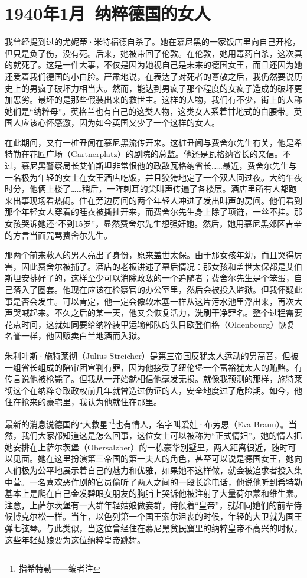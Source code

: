 \documentclass[UTF8]{ctexart}
\begin{document}
\section{1940年1月\ 纳粹德国的女人}

我曾经提到过的尤妮蒂·米特福德自杀了。她在慕尼黑的一家饭店里向自己开枪，但只是负了伤，没有死。后来，她被带回了伦敦。在伦敦，她用毒药自杀，这次真的就死了。这是一件大事，不仅是因为她视自己是未来的德国女王，而且还因为她还爱着我们德国的小白脸。严肃地说，在表达了对死者的尊敬之后，我仍然要说历史上的男疯子破坏力相当大。然而，能达到男疯子那个程度的女疯子造成的破坏更加恶劣。最坏的是那些假装出来的救世主。这样的人物，我们有不少，街上的人称她们是“纳粹母”。英格兰也有自己的这类人物，这类女人系着甘地式的白腰带。英国人应该心怀感激，因为如今英国又少了一个这样的女人。

在此期间，又有一桩丑闻在慕尼黑流传开来。这桩丑闻与费舍尔先生有关，他是希特勒在花匠广场（Gartnerplatz）的剧院的总监。他还是瓦格纳省长的亲信。不过，慕尼黑警察局长艾伯斯坦非常恨他的政敌瓦格纳省长……最近，费舍尔先生与一名极为年轻的女士在女王酒店吃饭，并且狡猾地定了一个双人间过夜。大约午夜时分，他俩上楼了……稍后，一阵刺耳的尖叫声传遍了各楼层。酒店里所有人都跑来出事现场看热闹。住在旁边房间的两个年轻人冲进了发出叫声的房间。他们看到那个年轻女人穿着的睡衣被撕扯开来，而费舍尔先生身上除了项链，一丝不挂。那女孩哭诉她还“不到15岁”，显然费舍尔先生想强奸她。然后，她用慕尼黑郊区吉辛的方言当面咒骂费舍尔先生。

那两个前来救人的男人亮出了身份，原来盖世太保。由于那女孩年幼，而且哭得厉害，因此费舍尔被捕了。酒店的老板讲述了幕后情况：那女孩和盖世太保都是艾伯斯坦安排好了的，这样至少可以消除政敌的一个追随者；费舍尔先生是个笨蛋，自己落入了圈套。他现在应该在检察官的办公室里，然后会被投入监狱。但我怀疑此事是否会发生。可以肯定，他一定会像软木塞一样从这片污水池里浮出来，再次大声哭喊起来。不久之后的某一天，他又会恢复活力，洗刷干净罪名。整个过程需要花点时间，这就如同要给纳粹装甲运输部队的头目欧登伯格（Oldenbourg）恢复名誉一样，他因贩卖白兰地酒而入狱。

朱利叶斯·施特莱彻（Julius Streicher）是第三帝国反犹太人运动的男高音，但被一组省长组成的陪审团宣判有罪，因为他接受了纽伦堡一个富裕犹太人的贿赂。有传言说他被枪毙了。但我从一开始就相信他毫发无损。就像我预测的那样，施特莱彻这个在纳粹夺取政权前几年就曾造过伪证的人，安全地度过了危险期。如今，他住在抢来的豪宅里，我认为他就住在那里。

最新的消息说德国的“大救星”\footnote{指希特勒——编者注}也有情人，名字叫爱娃·布劳恩（Eva Braun）。当然，我们大家都知道这是怎么回事，这位女士可以被称为“正式情妇”。她的情人把她安排在上萨尔茨堡（Obersalzber）的一栋豪华别墅里，两人距离很近，随时可以见面。她在这里扮演第三帝国的第一夫人的角色，甚至可以说是德国女王，她向人们极为公平地展示着自己的魅力和优雅，如果她不这样做，就会被追求者投入集中营。一名喜欢恶作剧的官员偷听了两人之间的一段长途电话，他说他听到希特勒基本上是爬在自己金发碧眼女朋友的胸脯上哭诉他被注射了大量荷尔蒙和维生素。注意，上萨尔茨堡有一大群年轻姑娘做妾群，侍候着“皇帝”，就如同她们的前辈侍候博克尔松一样。当年，以色列第一个国王索尔沮丧的时候，年轻的大卫就为国王弹七弦琴。与此类似，当这位曾经住在慕尼黑贫民窟里的纳粹皇帝不高兴的时候，这些年轻姑娘要为这位纳粹皇帝跳舞。
\end{document}
